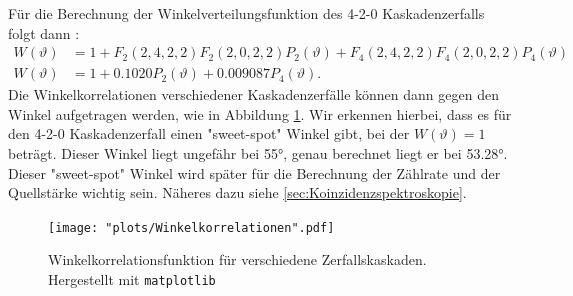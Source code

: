 \documentclass[%
aps,
onecolumn,
11pt,
tightenlines,
nofootinbib,
superscriptaddress,
floatfix,
prd,
]{revtex4-2}
\begin{document}
Für die Berechnung der Winkelverteilungsfunktion des 4-2-0 Kaskadenzerfalls folgt dann \cite{manual1}:
\begin{align}
	W(\vartheta) &= 1 + F_2(2,4,2,2)F_2(2,0,2,2)P_2(\vartheta) + F_4(2,4,2,2)F_4(2,0,2,2)P_4(\vartheta) \\
	W(\vartheta) &= 1 + 0.1020 P_2(\vartheta) + 0.009087 P_4(\vartheta). \nonumber
\end{align}
Die Winkelkorrelationen verschiedener Kaskadenzerfälle können dann gegen den Winkel aufgetragen werden, wie in Abbildung \ref{fig:angularcorrelation}. Wir erkennen hierbei, dass es für den 4-2-0 Kaskadenzerfall einen "sweet-spot" Winkel gibt, bei der $W(\vartheta)=1$ beträgt. Dieser Winkel liegt ungefähr bei 55°, genau berechnet liegt er bei 53.28°. Dieser "sweet-spot" Winkel wird später für die Berechnung der Zählrate und der Quellstärke wichtig sein. Näheres dazu siehe \ref{sec:Koinzidenzspektroskopie}.
\begin{figure}[ht]
		\texttt{[image: "plots/Winkelkorrelationen".pdf]}
	\caption{Winkelkorrelationsfunktion für verschiedene Zerfallskaskaden. Hergestellt mit \texttt{matplotlib}}
	\label{fig:angularcorrelation}
\end{figure}
\end{document}
